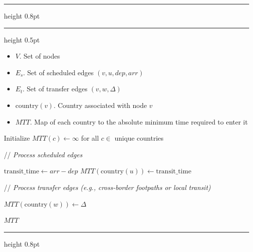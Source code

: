 \documentclass{article}
\newcommand{\CommentLine}[1]{
    \State // \textit{#1}
}
\begin{document}
\pagestyle{empty}
\allowdisplaybreaks[1] 
\setcounter{page}{1}


\setcounter{algorithm}{4}
\begin{center}
    \hrule height 0.8pt
    \vspace{0.3em}
    \label{alg:mtt_precomputation}
    \vspace{0.2em}
    \hrule height 0.5pt
\end{center}

\begin{algorithmic}[1] %
    
    \Input
    \begin{itemize}
        \item $V$. Set of nodes
        \item $E_s$. Set of scheduled edges $(v,u,dep,arr)$
        \item $E_t$. Set of transfer edges $(v,w,\Delta)$
        \item $\text{country}(v)$. Country associated with node $v$
    \end{itemize}

    \Output
    \begin{itemize}
        \item $MTT$. Map of each country to the absolute minimum time required to enter it
    \end{itemize}
    \vspace{0.5em} 

    \State Initialize $MTT(c) \leftarrow \infty$ for all $c \in$ unique countries

    \vspace{0.5em}
    \CommentLine{Process scheduled edges}
            \State $\text{transit\_time} \leftarrow arr - dep$
                \State $MTT(\text{country}(u)) \leftarrow \text{transit\_time}$
            \EndIf
        \EndIf
    \EndFor

    \vspace{0.5em}
    \CommentLine{Process transfer edges (e.g., cross-border footpaths or local transit)}
                \State $MTT(\text{country}(w)) \leftarrow \Delta$
            \EndIf
        \EndIf
    \EndFor

    \State \Return $MTT$

\end{algorithmic}

\hrule height 0.8pt
\end{document}
